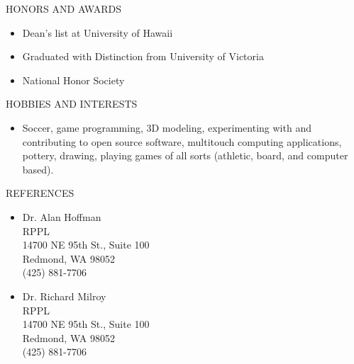 \documentclass[11pt,oneside]{article}
\newenvironment{ressection}[1]{
	\vspace{4pt}
	{\fontfamily{phv}\selectfont\Large#1}
	\begin{itemize}
	\vspace{3pt}
}{
	\end{itemize}
}
\newcommand{\resitem}[1]{
	\vspace{-4pt}
	\item \begin{flushleft} #1 \end{flushleft}
}
\begin{document}
\begin{ressection}{HONORS AND AWARDS}
    \resitem{Dean's list at University of Hawaii}
    \resitem{Graduated with Distinction from University of Victoria}
    \resitem{National Honor Society}
\end{ressection}

\begin{ressection}{HOBBIES AND INTERESTS}
\resitem{Soccer, game programming, 3D modeling, experimenting with and contributing to open source software, multitouch computing applications, pottery, drawing, playing games of all sorts (athletic, board, and computer based).}
\end{ressection}

\begin{ressection}{REFERENCES}
    \resitem{Dr. Alan Hoffman \\
    RPPL\\
    14700 NE 95th St., Suite 100\\
    Redmond, WA 98052\\
    (425) 881-7706}
    \resitem{Dr. Richard Milroy \\
    RPPL\\
    14700 NE 95th St., Suite 100\\
    Redmond, WA 98052\\
    (425) 881-7706}

\end{ressection}
\end{document}
